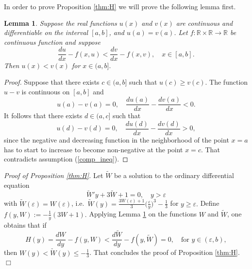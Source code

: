 \documentclass[reqno]{article}%
\theoremstyle{plain}
\newtheorem{lemma}{Lemma}[section]
\theoremstyle{definition}
\theoremstyle{remark}
\numberwithin{equation}{section}
\begin{document}
In order to prove Proposition \ref{thm:H} we will prove the following lemma first.
\begin{lemma}\label{lemma:comp}
Suppose the real functions $u(x)$ and $v(x)$ are continuous and differentiable on the interval $[a,b]$, and $u(a)=v(a)$. Let $f:\mathbb{R}\times \mathbb{R}\to \mathbb{R}$ be continuous function and suppose
\begin{equation}\label{comp_ineq}
\frac{du}{dx}-f(x,u)<\frac{dv}{dx}-f(x,v), \quad x\in[a,b].
\end{equation}
Then $u(x)< v(x)$ for $x\in(a,b].$
\end{lemma}
\begin{proof}
Suppose that there exists $c\in(a,b]$ such that $u(c)\geq v(c)$. The function $u-v$ is continuous on $[a,b]$ and 
\[u(a)-v(a)=0,\quad \frac{du(a)}{dx}-\frac{dv(a)}{dx}<0.\]
It follows that there exists $d\in(a,c]$ such that 
\[u(d)-v(d)=0,\quad \frac{du(d)}{dx}-\frac{dv(d)}{dx}>0,\]
since the negative and decreasing function in the neighborhood of the point $x=a$ has to start to increase to become non-negative at the point $x=c$. That contradicts assumption (\ref{comp_ineq}).
\end{proof}

\medskip

\noindent
{\it Proof of Proposition \ref{thm:H}.}
Let $\tilde{W}$ be a solution to the ordinary differential equation 
\[\tilde{W}'y+3\tilde{W}+1=0,\quad y>\varepsilon \]
with $\tilde{W}(\varepsilon)=W(\varepsilon)$,
i.e.\ $\tilde{W}(y)=\frac{3W(\varepsilon)+1}{3}\Big(\frac{\varepsilon}{y}\Big)^3-\frac{1}{3}$ for $y\geq \varepsilon.$
Define $f(y,W):= -\frac{1}{y}(3W+1).$ Applying Lemma \ref{lemma:comp} on the functions $W$ and $\tilde{W}$, one obtains that if 
\[H(y)=\frac{dW}{dy}-f(y,W)<\frac{d\tilde{W}}{dy}-f(y,\tilde{W})=0, \quad \text{for } y\in(\varepsilon,b),\]
then $W(y)<\tilde{W}(y)\leq -\frac{1}{3}$. That concludes the proof of Proposition \ref{thm:H}. \hfill $\Box$

\bigskip
\end{document}
